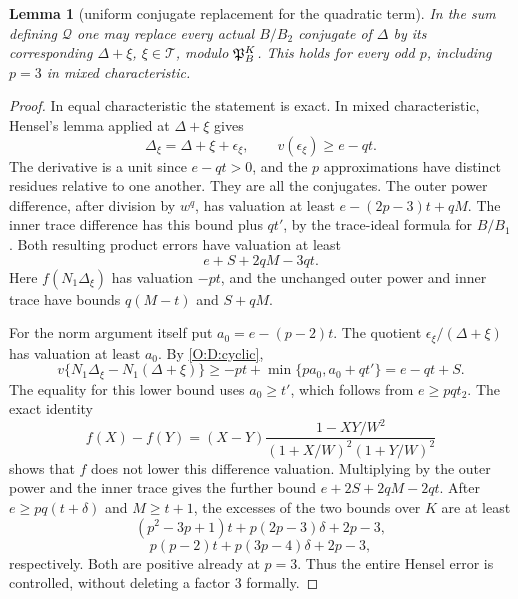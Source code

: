 \documentclass[11pt]{amsart}
\newtheorem{lemma}[theorem]{Lemma}
\theoremstyle{definition}
\theoremstyle{remark}
\begin{document}
\begin{lemma}[uniform conjugate replacement for the quadratic term]
\label{O:D:conjugates}
In the sum defining $\mathcal Q$ one may replace every actual
$B/B_2$ conjugate of $\Delta$ by its corresponding $\Delta+\xi$,
$\xi\in\mathcal T$, modulo $\mathfrak P_B^K$. This holds for every odd $p$,
including $p=3$ in mixed characteristic.
\end{lemma}
\begin{proof}
In equal characteristic the statement is exact. In mixed
characteristic, Hensel's lemma applied at $\Delta+\xi$ gives
\[
 \Delta_\xi=\Delta+\xi+\epsilon_\xi,\qquad
 v(\epsilon_\xi)\ge e-qt.
\]
The derivative is a unit since $e-qt>0$, and the $p$ approximations
have distinct residues relative to one another. They are all the
conjugates. The outer power difference, after division by $w^q$,
has valuation at least $e-(2p-3)t+qM$.
The inner trace difference has this bound plus $q t'$, by the
trace-ideal formula for $B/B_1$. Both resulting product errors have
valuation at least
\begin{equation}\label{O:D:Henselprod}
 e+S+2qM-3qt.
\end{equation}
Here $f(N_1\Delta_\xi)$ has valuation $-pt$, and the unchanged
outer power and inner trace have bounds $q(M-t)$ and $S+qM$.

For the norm argument itself put $a_0=e-(p-2)t$. The quotient
$\epsilon_\xi/(\Delta+\xi)$ has valuation at least $a_0$.
By \eqref{O:D:cyclic},
\[
 v\{N_1\Delta_\xi-N_1(\Delta+\xi)\}
 \ge-pt+\min\{pa_0,a_0+qt'\}=e-qt+S.
\]
The equality for this lower bound uses $a_0\ge t'$, which follows
from $e\ge pq t_2$. The exact identity
\[
 f(X)-f(Y)=(X-Y)\frac{1-XY/W^2}
 {(1+X/W)^2(1+Y/W)^2}
\]
shows that $f$ does not lower this difference valuation. Multiplying
by the outer power and the inner trace gives the further bound
$e+2S+2qM-2qt$.
After $e\ge pq(t+\delta)$ and $M\ge t+1$, the excesses of the two
bounds over $K$ are at least
\[
 (p^2-3p+1)t+p(2p-3)\delta+2p-3,
\]
\[
 p(p-2)t+p(3p-4)\delta+2p-3,
\]
respectively. Both are positive already at $p=3$. Thus the entire
Hensel error is controlled, without deleting a factor $3$ formally.
\end{proof}
\end{document}
